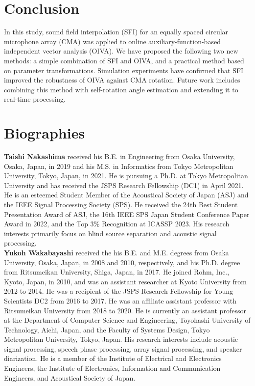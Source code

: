 \documentclass[sip,biber]{now-journal}
\begin{document}
\section{Conclusion}\label{sec:conclusion}
In this study, sound field interpolation (SFI) for an equally spaced circular microphone array (CMA) was applied to online auxiliary-function-based independent vector analysis (OIVA).
We have proposed the following two new methods: a simple combination of SFI and OIVA, and a practical method based on parameter transformations.
Simulation experiments have confirmed that SFI improved the robustness of OIVA against CMA rotation.
Future work includes combining this method with self-rotation angle estimation \cite{Lian:2021:APSIPA} and extending it to real-time processing.

\section*{Biographies}

\noindent\normalsize\textbf{Taishi Nakashima}
received his B.E. in Engineering from Osaka University, Osaka, Japan, in 2019 and his M.S. in Informatics from Tokyo Metropolitan University, Tokyo, Japan, in 2021.
He is pursuing a Ph.D. at Tokyo Metropolitan University and has received the JSPS Research Fellowship (DC1) in April 2021.
He is an esteemed Student Member of the Acoustical Society of Japan (ASJ) and the IEEE Signal Processing Society (SPS).
He received the 24th Best Student Presentation Award of ASJ, the 16th IEEE SPS Japan Student Conference Paper Award in 2022, and the Top 3\% Recognition at ICASSP 2023.
His research interests primarily focus on blind source separation and acoustic signal processing.
\\

\noindent\normalsize\textbf{Yukoh Wakabayashi}
received the his B.E. and M.E. degrees from Osaka University, Osaka, Japan, in 2008 and 2010, respectively, and his Ph.D. degree from Ritsumeikan University, Shiga, Japan, in 2017.
He joined Rohm, Inc., Kyoto, Japan, in 2010, and was an assistant researcher at Kyoto University from 2012 to 2014.
He was a recipient of the JSPS Research Fellowship for Young Scientists DC2 from 2016 to 2017.
He was an affiliate assistant professor with Ritsumeikan University from 2018 to 2020.
He is currently an assistant professor at the Department of Computer Science and Engineering, Toyohashi University of Technology, Aichi, Japan, and the Faculty of Systems Design, Tokyo Metropolitan University, Tokyo, Japan.
His research interests include acoustic signal processing, speech phase processing, array signal processing, and speaker diarization.
He is a member of the Institute of Electrical and Electronics Engineers, the Institute of Electronics, Information and Communication Engineers, and Acoustical Society of Japan.
\\
\end{document}

